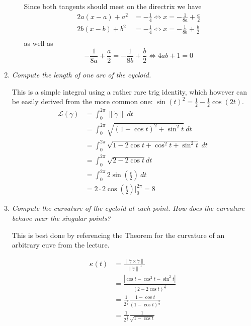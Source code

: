 \documentclass[a4paper,11pt,notitlepage,fullpage]{article}
\begin{document}
\begin{enumerate}
\begin{enumerate}
Since both tangents should meet on the directrix we have
\begin{align*}
	2a(x-a)+a^2&=-\frac{1}{4} \Leftrightarrow x=-\frac{1}{8a}+\frac{a}{2} \\
	2b(x-b)+b^2&=-\frac{1}{4} \Leftrightarrow x=-\frac{1}{8b}+\frac{b}{2}\\
\end{align*}
as well as
\begin{equation*}
	-\frac{1}{8a}+\frac{a}{2} = -\frac{1}{8b}+\frac{b}{2} \Leftrightarrow 4ab+1=0
\end{equation*}
\end{enumerate}

\item \emph{Compute the length of one arc of the cycloid.}

This is a simple integral using a rather rare trig identity, which however can be easily derived from the more common one: $\sin(t)^2 = \frac{1}{2} - \frac{1}{2}\cos(2t)$.
\begin{align*}
\mathcal L(\gamma) &= \int_0^{2\pi} \left\| \dot\gamma \right\| ~dt \\
&= \int_0^{2\pi} \sqrt{(1-\cos t)^2 + \sin^2 t} ~dt \\
&= \int_0^{2\pi} \sqrt{1 - 2\cos t + \cos^2 t + \sin^2 t} ~dt \\
&= \int_0^{2\pi} \sqrt{2 - 2\cos t} dt \\
&= \int_0^{2\pi} 2 \sin\left(\frac{t}{2}\right) ~dt \\
&= 2 \cdot 2 \cos\left(\frac{t}{2}\right)\Bigg|_0^{2\pi} = 8
\end{align*}


\item \emph{Compute the curvature of the cycloid at each point. How does the curvature behave near the singular points?}

This is best done by referencing the Theorem for the curvature of an arbitrary cuve from the lecture.

\begin{align*}
\kappa(t) &= \frac{\left\|\dot\gamma \times \ddot\gamma\right\|}{\left\|\dot\gamma\right\|^3} \\
&= \frac{|\cos t - \cos^2 t - \sin^2 t|}{(2 - 2\cos t)^{\frac{3}{2}}} \\
&= \frac{1}{2^{\frac{3}{2}}} \frac{1 - \cos t}{(1 - \cos t)^{\frac{3}{2}}} \\
&= \frac{1}{2^{\frac{3}{2}}} \frac{1}{\sqrt{1 - \cos t}}
\end{align*}


\end{enumerate}
\end{document}
